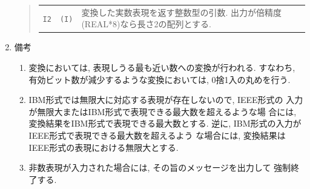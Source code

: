 \begin{enumerate}
\begin{quote}
\begin{tabular}{llp{10cm}}
      {\tt I2} & {\tt (I)} & 変換した実数表現を返す整数型の引数.
                            出力が倍精度(REAL*8)なら長さ2の配列とする.
    \end{tabular}
  \end{quote}
  \item 備考
  \begin{enumerate}
    \item 変換においては, 表現しうる最も近い数への変換が行われる. 
         すなわち, 有効ビット数が減少するような変換においては, 
          0捨1入の丸めを行う.
    \item IBM形式では無限大に対応する表現が存在しないので, IEEE形式の
          入力が無限大またはIBM形式で表現できる最大数を超えるような場
          合には, 変換結果をIBM形式で表現できる最大数とする. 
          逆に, IBM形式の入力がIEEE形式で表現できる最大数を超えるよう
          な場合には, 変換結果はIEEE形式の表現における無限大とする.
    \item 非数表現が入力された場合には, その旨のメッセージを出力して
          強制終了する.
  \end{enumerate}
\end{enumerate}



